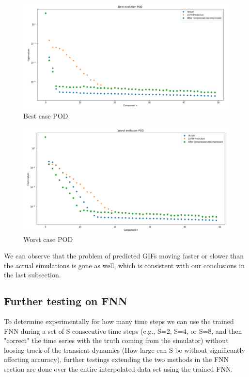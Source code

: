 \begin{figure}[H]
    \caption{Best case POD}
    \includegraphics[scale=0.5]{Report LaTeX/figures/mantle_convection_images/larger_dataset_interpolated/LSTM_Best_POD.png}
\end{figure}

\begin{figure}[H]
    \caption{Worst case POD}
    \includegraphics[scale=0.5]{Report LaTeX/figures/mantle_convection_images/larger_dataset_interpolated/LSTM_Worst_POD.png}
\end{figure}


We can observe that the problem of predicted GIFs moving faster or slower than the actual simulations is gone as well, which is consistent with our conclusions in the last subsection.


\subsection{Further testing on FNN}

To determine experimentally for how many time steps we can use the trained FNN during a set of S consecutive time steps (e.g., S=2, S=4, or S=8, and then "correct" the time series with the truth coming from the simulator) without loosing track of the transient dynamics (How large can S be without significantly affecting accuracy), further testings extending the two methods in the FNN section are done over the entire interpolated data set using the trained FNN.

